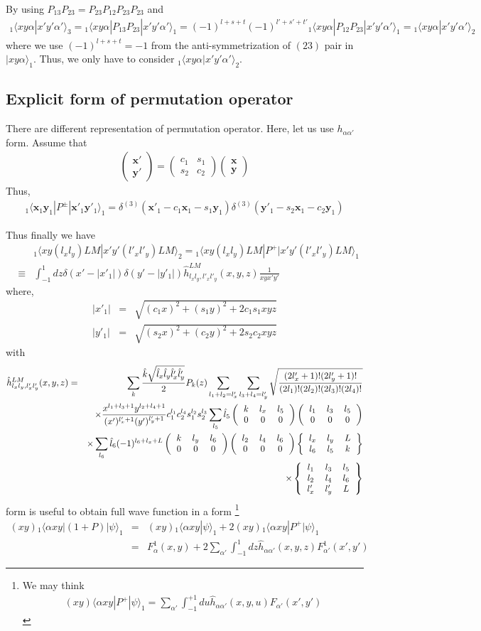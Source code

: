 \documentclass[11pt]{article}
\def\bm{\boldsymbol}
\newcommand{\bea}{\begin{eqnarray}}
\newcommand{\eea}{\end{eqnarray}}
\newcommand{\no}{\nonumber \\}
\newcommand{\vx}{{\bm x}}
\newcommand{\vy}{{\bm y}}
\newcommand{\la}{\langle}
\newcommand{\ra}{\rangle}
\newcommand{\threejsymbol}[6]{\left(\begin{tabular}{ccc} {$#1$}&{$#2$}&{$#3$}\\
                             {$#4$}&{$#5$}&{$#6$}\end{tabular}\right)}
\newcommand{\sixjsymbol}[6]{\left\{\begin{tabular}{ccc} {$#1$}&{$#2$}&{$#3$}\\
                             {$#4$}&{$#5$}&{$#6$} \end{tabular}\right\}}
\newcommand{\ninejsymbol}[9]{\left\{\begin{tabular}{ccc}
                             {$#1$}&{$#2$}&{$#3$}\\
                             {$#4$}&{$#5$}&{$#6$}\\
                             {$#7$}&{$#8$}&{$#9$}\end{tabular}\right\}}
\begin{document}
By using $P_{13}P_{23}=P_{23}P_{12}P_{23}P_{23}$ and 
\bea
{}_1\la x y \alpha|x' y' \alpha'\ra_3
={}_1\la x y \alpha|P_{13}P_{23}|x' y' \alpha'\ra_1
=(-1)^{l+s+t}(-1)^{l'+s'+t'}{}_1\la x y\alpha|P_{12}P_{23}|x'y'\alpha'\ra_1
={}_1\la x y \alpha|x' y'\alpha'\ra_2
\eea
where we use $(-1)^{l+s+t}=-1$ from the anti-symmetrization of $(23)$ pair
in $|x y\alpha\ra_1$. Thus, we only have to 
consider ${}_1\la x y \alpha|x' y'\alpha'\ra_2$.

\subsection{Explicit form of permutation operator}
There are different representation of permutation
operator. Here, let us use $h_{\alpha\alpha'}$ form.
Assume that
\bea
\left(\begin{array}{c} \vx' \\ \vy'\end{array}\right)
=\left(\begin{array}{cc} c_1 & s_1 \\ s_2 &c_2\end{array}\right)
 \left(\begin{array}{c} \vx \\ \vy\end{array}\right)
\eea
Thus,
\bea
{}_1\la \vx_1 \vy_1|P^{\pm}|\vx'_1\vy'_1\ra_1
=\delta^{(3)}(\vx'_1-c_1\vx_1-s_1\vy_1)
 \delta^{(3)}(\vy'_1-s_2\vx_1-c_2\vy_1)
\eea

Thus finally we have
\bea 
& &{}_1\la x y (l_x l_y)L M| x' y'(l'_xl'_y)L M \ra_2
={}_1\la x y (l_x l_y)L M|P^+| x' y'(l'_xl'_y)L M \ra_1
\no
&\equiv&\int_{-1}^1 dz \delta(x'-|x'_1|)\delta(y'-|y'_1|) 
    \hat{h}^{LM}_{l_xl_y,l'_x l'_y}(x,y,z)\frac{1}{ x y x' y'}
\eea
where,
\bea
|x'_1|&=&\sqrt{(c_1 x)^2+(s_1 y)^2+2 c_1 s_1 x y z} \no
|y'_1|&=&\sqrt{(s_2 x)^2+(c_2 y)^2+2 s_2 c_2 x y z}
\eea
with
\bea
\hat{h}^{LM}_{l_xl_y,l'_xl'_y}(x,y,z)
&=&\sum_k \frac{\hat{k}\sqrt{\hat{l}_x\hat{l}_y\hat{l}'_x\hat{l}'_y}}{2}
        P_k(z)
 \sum_{l_1+l_2=l'_x}\sum_{l_3+l_4=l'_y}
 \sqrt{\frac{(2l'_x+1)!(2l'_y+1)!}{(2l_1)!(2l_2)!(2l_3)!(2l_4)!}}
 \no
& &\times\frac{x^{l_1+l_3+1}y^{l_2+l_4+1}}{(x')^{l'_x+1}(y')^{l'_y+1}}
 c_1^{l_1}c_2^{l_4}s_1^{l_2}s_2^{l_3}
 \sum_{l_5}\hat{l}_5\threejsymbol{k}{l_x}{l_5}{0}{0}{0}
  \threejsymbol{l_1}{l_3}{l_5}{0}{0}{0}
  \no & &\times
  \sum_{l_6}\hat{l}_6(-1)^{l_6+l_x+L}
  \threejsymbol{k}{l_y}{l_6}{0}{0}{0}
  \threejsymbol{l_2}{l_4}{l_6}{0}{0}{0}
  \sixjsymbol{l_x}{l_y}{L}{l_6}{l_5}{k}
  \no & &\times
  \ninejsymbol{l_1}{l_3}{l_5}{l_2}{l_4}{l_6}{l'_x}{l'_y}{L}          
\eea
form is useful to obtain full wave function
in a form
\footnote{
We may think
\bea
(xy)\la \alpha xy|P^+|\psi\ra_1
=\sum_{\alpha'}\int_{-1}^{+1} du \hat{h}_{\alpha\alpha'}(x,y,u)F_{\alpha'}(x',y')
\eea
}
\bea
(x y){}_1\la \alpha x y|(1+P)|\psi\ra_1
&=&(x y){}_1\la \alpha x y|\psi\ra_1+2(xy){}_1\la \alpha x y|P^+|\psi\ra_1 \no
&=&
F_\alpha^1(x,y)
+2\sum_{\alpha'}\int_{-1}^1 dz \hat{h}_{\alpha\alpha'}(x,y,z)
 F^1_{\alpha'}(x',y')
\eea
\end{document}
